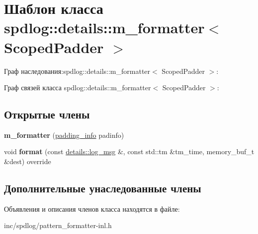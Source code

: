 \hypertarget{classspdlog_1_1details_1_1m__formatter}{}\section{Шаблон класса spdlog\+:\+:details\+:\+:m\+\_\+formatter$<$ Scoped\+Padder $>$}
\label{classspdlog_1_1details_1_1m__formatter}


Граф наследования\+:spdlog\+:\+:details\+:\+:m\+\_\+formatter$<$ Scoped\+Padder $>$\+:


Граф связей класса spdlog\+:\+:details\+:\+:m\+\_\+formatter$<$ Scoped\+Padder $>$\+:
\subsection*{Открытые члены}
\begin{DoxyCompactItemize}
\item 
\mbox{\label{classspdlog_1_1details_1_1m__formatter_a1772628199ec13f7ac375f84244bf21a}} 
{\bfseries m\+\_\+formatter} (\hyperlink{structspdlog_1_1details_1_1padding__info}{padding\+\_\+info} padinfo)
\item 
\mbox{\label{classspdlog_1_1details_1_1m__formatter_a92b2971eb1c25717606fe701fad906e9}} 
void {\bfseries format} (const \hyperlink{structspdlog_1_1details_1_1log__msg}{details\+::log\+\_\+msg} \&, const std\+::tm \&tm\+\_\+time, memory\+\_\+buf\+\_\+t \&dest) override
\end{DoxyCompactItemize}
\subsection*{Дополнительные унаследованные члены}


Объявления и описания членов класса находятся в файле\+:\begin{DoxyCompactItemize}
\item 
inc/spdlog/pattern\+\_\+formatter-\/inl.\+h\end{DoxyCompactItemize}
